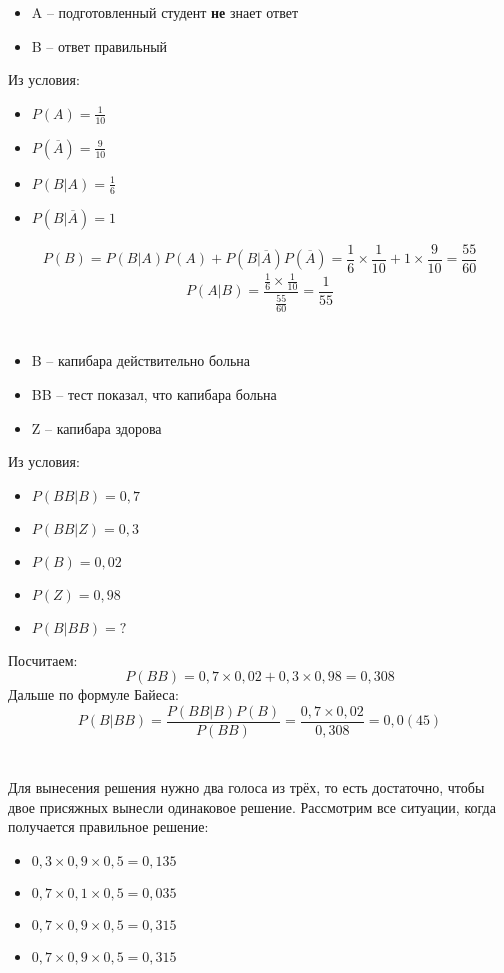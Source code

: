 \documentclass[a4paper,10pt]{article}
\begin{document}
\section{}
\begin{itemize}
 \item A -- подготовленный студент \textbf{не} знает ответ
 \item B -- ответ правильный
\end{itemize}
Из условия:
\begin{itemize}
 \item $P(A) = \frac{1}{10}$
 \item $P(\overline{A}) = \frac{9}{10}$
 \item $P(B|A) = \frac{1}{6}$
 \item $P(B|\overline{A}) = 1$
\end{itemize}

$$
P(B) = P(B|A)P(A) + P(B|\overline{A})P(\overline{A})
= \frac{1}{6} \times \frac{1}{10} + 1 \times \frac{9}{10}
= \frac{55}{60}
$$
$$ P(A|B) = \frac{\frac{1}{6} \times \frac{1}{10}}{\frac{55}{60}} = \frac{1}{55} $$

\section{}
\begin{itemize}
 \item B -- капибара действительно больна
 \item BB -- тест показал, что капибара больна
 \item Z -- капибара здорова
\end{itemize}
Из условия:
\begin{itemize}
 \item $P(BB|B) = 0,7$
 \item $P(BB|Z) = 0,3$
 \item $P(B) = 0,02$
 \item $P(Z) = 0,98$
 \item $P(B|BB) = ?$
\end{itemize}

Посчитаем:
$$ P(BB) = 0,7 \times 0,02 + 0,3 \times 0,98 = 0,308 $$
Дальше по формуле Байеса:
$$
P(B|BB) = \frac{P(BB|B)P(B)}{P(BB)}
= \frac{0,7 \times 0,02}{0,308} = 0,0(45)
$$

\section{}
Для вынесения решения нужно два голоса из трёх, то есть достаточно, чтобы двое присяжных вынесли одинаковое решение. Рассмотрим все ситуации, когда получается правильное решение:
\begin{itemize}
 \item $0,3 \times 0,9 \times 0,5 = 0,135$
 \item $0,7 \times 0,1 \times 0,5 = 0,035$
 \item $0,7 \times 0,9 \times 0,5 = 0,315$
 \item $0,7 \times 0,9 \times 0,5 = 0,315$
\end{itemize}
\end{document}
